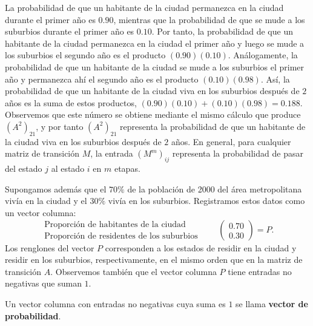 \documentclass[12pt,a4paper]{book}
\begin{document}
    La probabilidad de que un habitante de la ciudad permanezca en la ciudad durante el primer año es $0.90$, mientras que la probabilidad de que se mude a los suburbios durante el primer año es $0.10$. Por tanto, la probabilidad de que un habitante de la ciudad permanezca en la ciudad el primer año y luego se mude a los suburbios el segundo año es el producto $(0.90)(0.10)$. Análogamente, la probabilidad de que un habitante de la ciudad se mude a los suburbios el primer año y permanezca ahí el segundo año es el producto $(0.10)(0.98)$. Así, la probabilidad de que un habitante de la ciudad viva en los suburbios después de $2$ años es la suma de estos productos, $(0.90)(0.10)+(0.10)(0.98)=0.188$. Observemos que este número se obtiene mediante el mismo cálculo que produce $(A^2)_{21}$, y por tanto $(A^2)_{21}$ representa la probabilidad de que un habitante de la ciudad viva en los suburbios después de $2$ años. En general, para cualquier matriz de transición $M$, la entrada $(M^m)_{ij}$ representa la probabilidad de pasar del estado $j$ al estado $i$ en $m$ etapas.

    Supongamos además que el $70\%$ de la población de 2000 del área metropolitana vivía en la ciudad y el $30\%$ vivía en los suburbios. Registramos estos datos como un vector columna:
    \begin{equation*}
        \begin{array}{c}
            \text{Proporción de habitantes de la ciudad}\\
            \text{Proporción de residentes de los suburbios}
        \end{array}\qquad
        \begin{pmatrix}0.70\\0.30\end{pmatrix}=P.
    \end{equation*}
    Los renglones del vector $P$ corresponden a los estados de residir en la ciudad y residir en los suburbios, respectivamente, en el mismo orden que en la matriz de transición $A$. Observemos también que el vector columna $P$ tiene entradas no negativas que suman $1$.

    \begin{definicion}
        Un vector columna con entradas no negativas cuya suma es $1$ se llama \textbf{vector de probabilidad}.
    \end{definicion}
\end{document}

